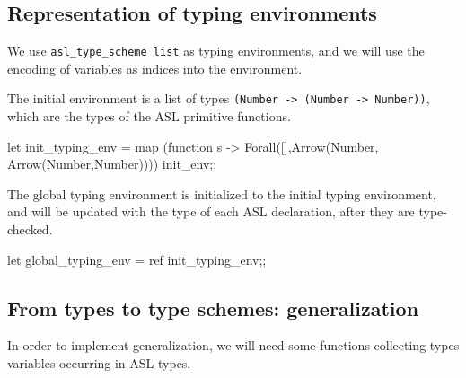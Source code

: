\subsection{Representation of typing environments}
%

We use \verb"asl_type_scheme list" as typing environments, and we will use
the encoding of variables as indices into the environment.

The initial environment is a list of types %
\verb"(Number -> (Number -> Number))", which are the types of the ASL
primitive functions.
\begin{caml_example*}
let init_typing_env =
    map (function s ->
            Forall([],Arrow(Number,
                              Arrow(Number,Number))))
        init_env;;
\end{caml_example*}
%
The global typing environment is initialized to the initial
typing environment, and will be updated with the type of each ASL
declaration, after they are type-checked.
\begin{caml_example*}
let global_typing_env = ref init_typing_env;;
\end{caml_example*}

\subsection{From types to type schemes: generalization}
%

In order to implement generalization, we will need some functions collecting
types variables occurring in ASL types.

